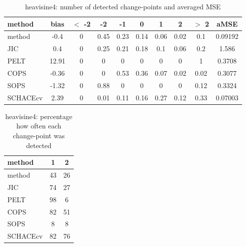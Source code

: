 \begin{table}[ht]
\centering
\begin{tabular}{l|c|ccccccc|c}
  \hline
method & bias & $<$ -2 & -2 & -1 & 0 & 1 & 2 & $>$ 2 & aMSE \\ 
  \hline
method &  -0.4 &     0 &  0.45 &  0.23 &  0.14 &  0.06 &  0.02 &   0.1 & 0.09192 \\ 
  JIC &   0.4 &     0 &  0.25 &  0.21 &  0.18 &   0.1 &  0.06 &   0.2 & 1.586 \\ 
  PELT & 12.91 &     0 &     0 &     0 &     0 &     0 &     0 &     1 & 0.3708 \\ 
  COPS & -0.36 &     0 &     0 &  0.53 &  0.36 &  0.07 &  0.02 &  0.02 & 0.3077 \\ 
  SOPS & -1.32 &     0 &  0.88 &     0 &     0 &     0 &     0 &  0.12 & 0.3324 \\ 
  SCHACEcv &  2.39 &     0 &  0.01 &  0.11 &  0.16 &  0.27 &  0.12 &  0.33 & 0.07003 \\ 
   \hline
\end{tabular}
\caption{heavisine4: number of detected change-points and averaged MSE} 
\label{tab:heavisine4Njumps}
\end{table}
\begin{table}[ht]
\centering
\begin{tabular}{l|cc}
  \hline
method & 1 & 2 \\ 
  \hline
method &     43 &     26 \\ 
  JIC &     74 &     27 \\ 
  PELT &     98 &      6 \\ 
  COPS &     82 &     51 \\ 
  SOPS &      8 &      8 \\ 
  SCHACEcv &     82 &     76 \\ 
   \hline
\end{tabular}
\caption{heavisine4: percentage how often each change-point was detected} 
\label{tab:heavisine4Detections}
\end{table}
